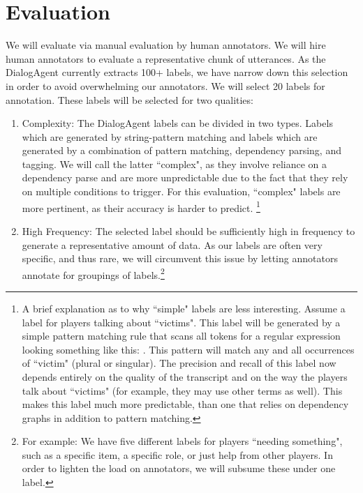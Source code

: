 \section{Evaluation}

We will evaluate via manual evaluation by human annotators. We will hire human
annotators to evaluate a representative chunk of utterances. As the DialogAgent
currently extracts 100+ labels, we have narrow down this selection in order to
avoid overwhelming our annotators.  We will select 20 labels for annotation.
These labels will be selected for two qualities:

\begin{enumerate}

\item Complexity: The DialogAgent labels can be divided in two types. Labels
    which are generated by string-pattern matching and labels which are
    generated by a combination of pattern matching, dependency parsing, and
    tagging. We will call the latter ``complex", as they involve reliance on a
    dependency parse and are more unpredictable due to the fact that they rely
    on multiple conditions to trigger. For this evaluation, ``complex" labels
    are more pertinent, as their accuracy is harder to predict. \footnote{A
        brief explanation as to why ``simple" labels are less interesting.
        Assume a label for players talking about ``victims". This label will be
        generated by a simple pattern matching rule that scans all tokens for a
        regular expression looking something like this: 
        .  This pattern will match any and all occurrences of
        ``victim" (plural or singular). The precision and recall of this label
        now depends entirely on the quality of the transcript and on the way
        the players talk about ``victims" (for example, they may use other
        terms as well). This makes this label much more predictable, than one
        that relies on dependency graphs in addition to pattern matching.}

\item High Frequency: The selected label should be sufficiently high in
    frequency to generate a representative amount of data. As our labels are
    often very specific, and thus rare, we will circumvent this issue by
    letting annotators annotate for groupings of labels.\footnote{For example:
    We have five different labels for players ``needing something", such as a
specific item, a specific role, or just help from other players. In order to
lighten the load on annotators, we will subsume these under one label.}

\end{enumerate}

